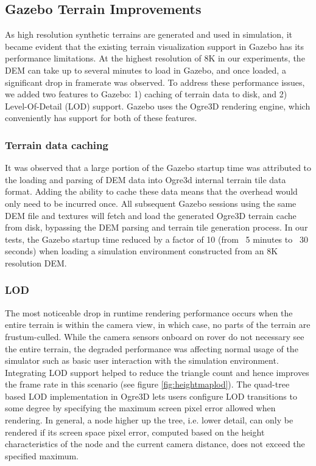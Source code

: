 \documentclass[twocolumn,letterpaper]{IEEEAerospaceCLS}  %
\begin{document}
\subsection{Gazebo Terrain Improvements}

As high resolution synthetic terrains are generated and used in simulation, it became evident that the existing terrain visualization support in Gazebo has its performance limitations. 
At the highest resolution of 8K in our experiments, the DEM can take up to several minutes to load in Gazebo, and once loaded, a significant drop in framerate was observed. 
To address these performance issues, we added two features to Gazebo: 1) caching of terrain data to disk, and 2) Level-Of-Detail (LOD) support. 
Gazebo uses the Ogre3D rendering engine, which conveniently has support for both of these features. 

\subsubsection{Terrain data caching}

It was observed that a large portion of the Gazebo startup time was attributed to the loading and parsing of DEM data into Ogre3d internal terrain tile data format. 
Adding the ability to cache these data means that the overhead would only need to be incurred once. 
All subsequent Gazebo sessions using the same DEM file and textures will fetch and load the generated Ogre3D terrain cache from disk, bypassing the DEM parsing and terrain tile generation process. 
In our tests, the Gazebo startup time reduced by a factor of 10 (from ~5 minutes to ~30 seconds) when loading a simulation environment constructed from an 8K resolution DEM.

\subsubsection{LOD}

The most noticeable drop in runtime rendering performance occurs when the entire terrain is within the camera view, in which case, no parts of the terrain are frustum-culled. 
While the camera sensors onboard on rover do not necessary see the entire terrain, the degraded performance was affecting normal usage of the simulator such as basic user interaction with the simulation environment. 
Integrating LOD support helped to reduce the triangle count and hence improves the frame rate in this scenario (see figure \ref{fig:heightmaplod}). 
The quad-tree based LOD implementation in Ogre3D lets users configure LOD transitions to some degree by specifying the maximum screen pixel error allowed when rendering. 
In general, a node higher up the tree, i.e. lower detail, can only be rendered if its screen space pixel error, computed based on the height characteristics of the node and the current camera distance, does not exceed the specified maximum. 
\end{document}

